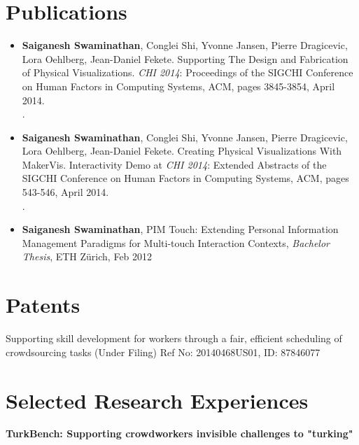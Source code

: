 \documentclass[11pt,a4paper,sans]{moderncv}   %
\begin{document}
\section{Publications}
\begin{itemize}
  \item  \textbf{Saiganesh Swaminathan}, Conglei Shi, Yvonne Jansen, Pierre Dragicevic, Lora Oehlberg, Jean-Daniel Fekete. Supporting The Design and Fabrication of Physical Visualizations. \textit{CHI 2014}: Proceedings of the SIGCHI Conference on Human Factors in Computing Systems, ACM, pages 3845-3854, April 2014.\\.
  
  \item   \textbf{Saiganesh Swaminathan}, Conglei Shi, Yvonne Jansen, Pierre Dragicevic, Lora Oehlberg, Jean-Daniel Fekete. Creating Physical Visualizations With MakerVis. Interactivity Demo at \textit{CHI 2014}: Extended Abstracts of the SIGCHI Conference on Human Factors in Computing Systems, ACM, pages 543-546, April 2014. \\.
  
  \item \textbf{Saiganesh Swaminathan}, PIM Touch: Extending Personal Information Management Paradigms for Multi-touch Interaction Contexts, \emph{Bachelor Thesis}, ETH Z\"urich, Feb 2012 
  
   
\end{itemize}

\section{Patents}

Supporting skill development for workers through a fair, efficient scheduling of crowdsourcing tasks (Under Filing) Ref No: 20140468US01, ID: 87846077  

\section{Selected Research Experiences}

 {\textbf{\textsf{TurkBench: Supporting crowdworkers invisible challenges to "turking"}}}
\end{document}
